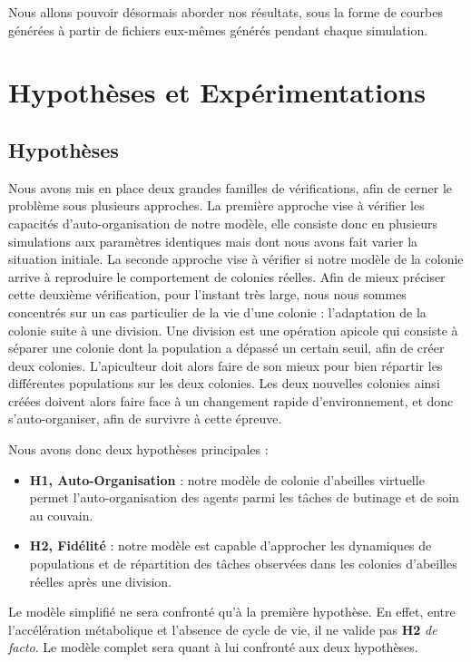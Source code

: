 		Nous allons pouvoir désormais aborder nos résultats, sous la forme de courbes générées à partir de fichiers eux-mêmes générés pendant chaque simulation. 
		
		
		
	\section{Hypothèses et Expérimentations}
		\subsection{Hypothèses}
			Nous avons mis en place deux grandes familles de vérifications, afin de cerner le problème sous plusieurs approches. La première approche vise à vérifier les capacités d'auto-organisation de notre modèle, elle consiste donc en plusieurs simulations aux paramètres identiques mais dont nous avons fait varier la situation initiale. La seconde approche vise à vérifier si notre modèle de la colonie arrive à reproduire le comportement de colonies réelles. Afin de mieux préciser cette deuxième vérification, pour l'instant très large, nous nous sommes concentrés sur un cas particulier de la vie d'une colonie : l'adaptation de la colonie suite à une division. Une division est une opération apicole qui consiste à séparer une colonie dont la population a dépassé un certain seuil, afin de créer deux colonies. L'apiculteur doit alors faire de son mieux pour bien répartir les différentes populations sur les deux colonies. Les deux nouvelles colonies ainsi créées doivent alors faire face à un changement rapide d'environnement, et donc s'auto-organiser, afin de survivre à cette épreuve.
			
			Nous avons donc deux hypothèses principales :
			\begin{itemize}
				\item \textbf{H1, Auto-Organisation} : notre modèle de colonie d'abeilles virtuelle permet l'auto-organisation des agents parmi les tâches de butinage et de soin au couvain.
				\item \textbf{H2, Fidélité} : notre modèle est capable d'approcher les dynamiques de populations et de répartition des tâches observées dans les colonies d'abeilles réelles après une division.
			\end{itemize}
			
		Le modèle simplifié ne sera confronté qu'à la première hypothèse. En effet, entre l'accélération métabolique et l'absence de cycle de vie, il ne valide pas \textbf{H2} \textit{de facto}. Le modèle complet sera quant à lui confronté aux deux hypothèses.
			
